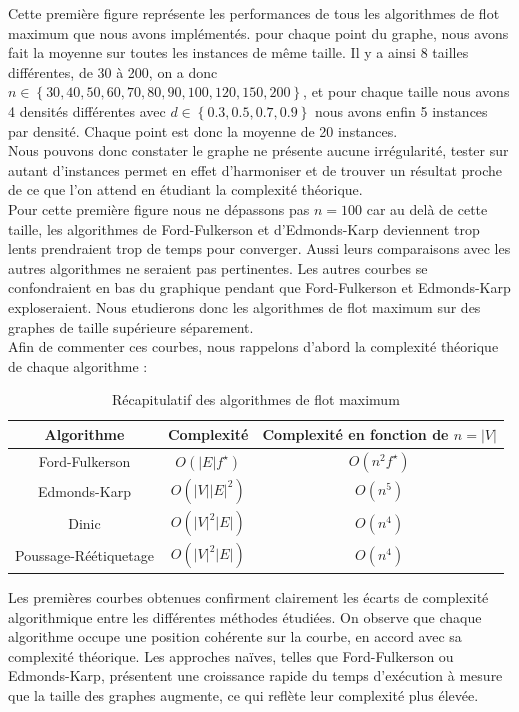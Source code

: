 \documentclass[a4paper]{article}
\begin{document}
Cette première figure représente les performances de tous les algorithmes de flot maximum que nous avons implémentés. pour chaque point du graphe, nous avons fait la moyenne sur toutes les instances de même taille. Il y a ainsi 8 tailles différentes, de 30 à 200, on a donc $n \in \left\{30, 40, 50, 60, 70, 80, 90, 100, 120, 150, 200\right\}$, et pour chaque taille nous avons 4 densités différentes avec $d \in \left\{0.3, 0.5, 0.7, 0.9\right\}$ nous avons enfin 5 instances par densité. Chaque point est donc la moyenne de 20 instances.\\

Nous pouvons donc constater le graphe ne présente aucune irrégularité, tester sur autant d'instances permet en effet d'harmoniser et de trouver un résultat proche de ce que l'on attend en étudiant la complexité théorique.\\

Pour cette première figure nous ne dépassons pas $n = 100$ car au delà de cette taille, les algorithmes de Ford-Fulkerson et d'Edmonds-Karp deviennent trop lents prendraient trop de temps pour converger. Aussi leurs comparaisons avec les autres algorithmes ne seraient pas pertinentes. Les autres courbes se confondraient en bas du graphique pendant que Ford-Fulkerson et Edmonds-Karp exploseraient. Nous etudierons donc les algorithmes de flot maximum sur des graphes de taille supérieure séparement.\\

Afin de commenter ces courbes, nous rappelons d'abord la complexité théorique de chaque algorithme :

\begin{table}[H]
	\centering
	\begin{tabular}{|c|c|c|}
		\hline
		Algorithme & Complexité & Complexité en fonction de $n = |V|$ \\
		\hline
		Ford-Fulkerson & $O(|E|f^\star)$ &$O(n^2 f^\star)$\\
		Edmonds-Karp & $O(|V||E|^2)$ &$O(n^5)$\\
		Dinic & $O(|V|^2|E|)$& $O(n^4)$\\
		Poussage-Réétiquetage & $O(|V|^2|E|)$&$O(n^4)$ \\
		\hline
	\end{tabular}
	\caption{Récapitulatif des algorithmes de flot maximum}
\end{table}

Les premières courbes obtenues confirment clairement les écarts de complexité algorithmique entre les différentes méthodes étudiées. On observe que chaque algorithme occupe une position cohérente sur la courbe, en accord avec sa complexité théorique. Les approches naïves, telles que Ford-Fulkerson ou Edmonds-Karp, présentent une croissance rapide du temps d'exécution à mesure que la taille des graphes augmente, ce qui reflète leur complexité plus élevée.\\
\end{document}
